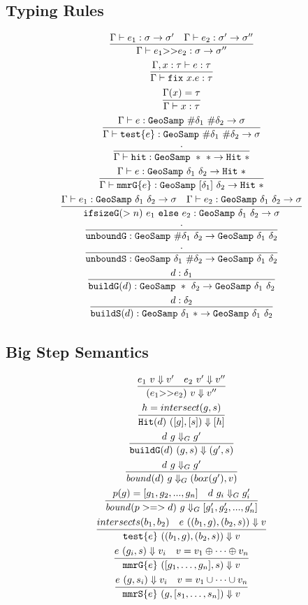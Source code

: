 \documentclass{article}
\newcommand {\chain}{\mathtt{>>}}
\newcommand {\fix}{\mathtt{fix}}
\newcommand {\test}{\mathtt{test}}
\newcommand {\isect}{\mathtt{hit}}
\newcommand {\buildG}{\mathtt{buildG}}
\newcommand {\buildS}{\mathtt{buildS}}
\newcommand {\unboundG}{\mathtt{unboundG}}
\newcommand {\unboundS}{\mathtt{unboundS}}
\newcommand {\mmrG}{\mathtt{mmrG}}
\newcommand {\mmrS}{\mathtt{mmrS}}
\newcommand {\geosamp}{\mathtt{GeoSamp}}
\newcommand {\hit}{\mathtt{Hit}}
\newcommand {\bound}{\mathit{bound}}
\newcommand {\inferenceSpacing}{\setlength{\jot}{3ex}}
\begin{document}
\subsection{Typing Rules}
\inferenceSpacing
\begin{gather}
\infer {\Gamma\vdash e_1 \chain e_2 : \sigma \to \sigma''}{\Gamma \vdash e_1 : \sigma\to \sigma' & \Gamma \vdash e_2 : \sigma' \to \sigma''} \\
\infer {\Gamma\vdash \fix~x.e : \tau}{\Gamma, x:\tau \vdash e : \tau} \\
\infer {\Gamma\vdash x : \tau}{\Gamma(x) = \tau} \\
\infer {\Gamma\vdash \test \{ e \} : \geosamp~\#\delta_1~\#\delta_2 \to \sigma}{\Gamma \vdash e : \geosamp~\#\delta_1~\#\delta_2  \to \sigma} \\
\infer {\Gamma \vdash \isect : \geosamp~\ast~\ast \to \hit~\ast} {\cdot} \\
\infer {\Gamma \vdash \mmrG \{ e \} : \geosamp~[\delta_1]~\delta_2 \to \hit~\ast} {\Gamma \vdash e : \geosamp~\delta_1~\delta_2 \to \hit~\ast }\\
\infer {\mathtt{ifsizeG}(>n)~e_1 \mathtt{~else~} e_2 : \geosamp~\delta_1~\delta_2 \to \sigma} {\Gamma \vdash e_1 : \geosamp~\delta_1~\delta_2 \to \sigma & \Gamma \vdash e_2 : \geosamp~\delta_1~\delta_2 \to \sigma} \\
\infer { \unboundG : \geosamp~\#\delta_1~\delta_2 \to \geosamp~\delta_1~\delta_2} {\cdot}\\
\infer { \unboundS : \geosamp~\delta_1~\#\delta_2 \to \geosamp~\delta_1~\delta_2} {\cdot}\\
\infer { \buildG (d): \geosamp~\ast~\delta_2 \to \geosamp~\delta_1~\delta_2} {d : \delta_1}\\
\infer { \buildS (d): \geosamp~\delta_1~\ast \to \geosamp~\delta_1~\delta_2} {d : \delta_2}
\end{gather}

\subsection {Big Step Semantics}
\begin{gather}
\infer {(e_1 \chain e_2)~v \Downarrow v''}{e_1~ v \Downarrow v' & e_2~ v' \Downarrow v''} \\
\infer { \hit (d)~([g],[s]) \Downarrow [h]}{h = intersect(g,s)} \\
\infer { \buildG (d)~(g,s) \Downarrow (g',s)}{d~g \Downarrow_G g'} \\
\infer { \bound (d)~g \Downarrow_G (box(g'),v)}{d~g \Downarrow_G g'} \\
\infer { \bound (p >=> d)~g \Downarrow_G [g_1', g_2',...,g_n']}{p(g) =[g_1, g_2,...,g_n] & d~g_i \Downarrow_G g_i'} \\
\infer { \test \{ e \}~((b_1,g),(b_2,s)) \Downarrow v}{intersects(b_1,b_2) & e~((b_1,g),(b_2,s)) \Downarrow v} \\
\infer { \mmrG \{ e \}~([g_1,\ldots,g_n],s) \Downarrow v}{e~(g_i,s) \Downarrow v_i & v = v_1 \oplus \cdots \oplus v_n}\\
\infer { \mmrS \{ e \}~(g,[s_1,\ldots,s_n]) \Downarrow v}{e~(g,s_i) \Downarrow v_i & v = v_1 \cup \cdots \cup v_n}
\end{gather}
\\
\end{document}

